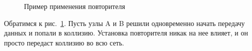 \begin{figure}[ht!]
	\caption{Пример применения повторителя}
	\label{fig:repeater}
\end{figure}

Обратимся к рис.~\ref{fig:repeater}. Пусть узлы A и B решили одновременно начать передачу данных и попали в коллизию. Установка повторителя никак на нее влияет, и он просто передаст коллизию во всю сеть. 
